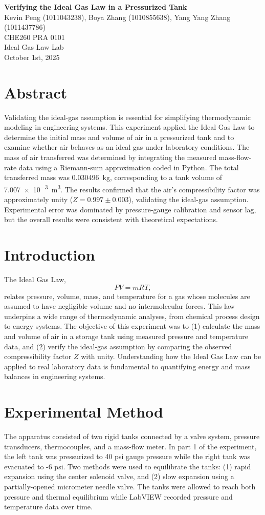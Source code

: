 \documentclass[12pt]{article}
\begin{document}
\begin{center}
\textbf{\Large Verifying the Ideal Gas Law in a Pressurized Tank} \\[0.5em]
Kevin Peng (1011043238), Boya Zhang (1010855638), Yang Yang Zhang (1011437786)\\[0.5em]
CHE260 PRA 0101 \\
Ideal Gas Law Lab \\
October 1st, 2025 \\
\end{center}

\section*{Abstract}
Validating the ideal-gas assumption is essential for simplifying thermodynamic modeling in engineering systems.
This experiment applied the Ideal Gas Law to determine the initial mass and volume of air in a pressurized tank and to examine whether air behaves as an ideal gas under laboratory conditions. The mass of air transferred was determined by integrating the measured mass-flow-rate data using a Riemann-sum approximation coded in Python. The total transferred mass was \SI{0.030496}{\kilogram}, corresponding to a tank volume of \SI{7.007e-3}{\metre\cubed}. The results confirmed that the air’s compressibility factor was approximately unity (\(Z = 0.997 \pm 0.003\)), validating the ideal-gas assumption. Experimental error was dominated by pressure-gauge calibration and sensor lag, but the overall results were consistent with theoretical expectations.

\section*{Introduction}
The Ideal Gas Law,
\[
PV = m R T,
\]
relates pressure, volume, mass, and temperature for a gas whose molecules are assumed to have negligible volume and no intermolecular forces. This law underpins a wide range of thermodynamic analyses, from chemical process design to energy systems. The objective of this experiment was to (1) calculate the mass and volume of air in a storage tank using measured pressure and temperature data, and (2) verify the ideal-gas assumption by comparing the observed compressibility factor \(Z\) with unity. Understanding how the Ideal Gas Law can be applied to real laboratory data is fundamental to quantifying energy and mass balances in engineering systems.

\section*{Experimental Method}
The apparatus consisted of two rigid tanks connected by a valve system, pressure transducers, thermocouples, and a mass-flow meter.
In part 1 of the experiment, the left tank was pressurized to 40 psi gauge pressure while the right tank was evacuated to -6 psi.
Two methods were used to equilibrate the tanks:
(1) rapid expansion using the center solenoid valve, and
(2) slow expansion using a partially-opened micrometer needle valve.
The tanks were allowed to reach both pressure and thermal equilibrium while LabVIEW recorded pressure and temperature data over time.
\end{document}
